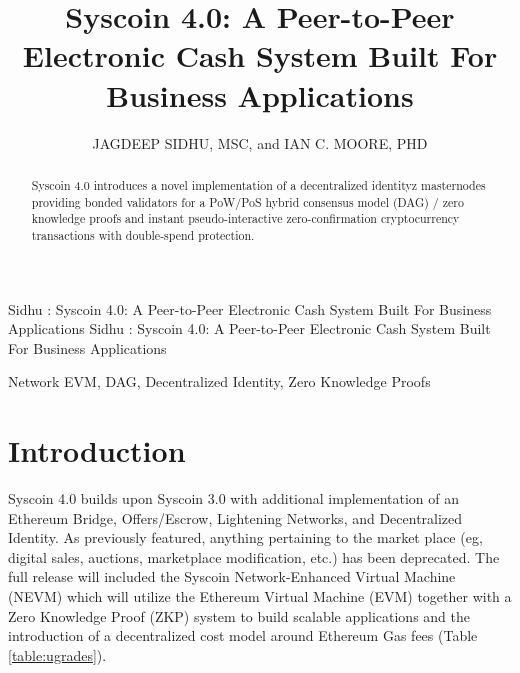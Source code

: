 \documentclass[peerreview]{ieeesyscoin}
\begin{document}
\linenumbers
\history{}

\title{\centering Syscoin 4.0: A Peer-to-Peer Electronic Cash System Built For Business Applications}
\author{\centering  \uppercase{Jagdeep Sidhu, MSc}, 
and \uppercase{Ian C. Moore, PhD}}

\address[1]{\centering Syscoin Core Developer, Blockchain Foundry Inc.(e-mail: jsidhu@blockchainfoundry.co)}
\address[2]{\centering  (e-mail: ic3moore@gmail.com)}
\tfootnote{}

\markboth
{Sidhu \headeretal: Syscoin 4.0: A Peer-to-Peer Electronic Cash System Built For Business Applications}
{Sidhu \headeretal: Syscoin 4.0: A Peer-to-Peer Electronic Cash System Built For Business Applications}

\corresp{}

\begin{abstract}
Syscoin 4.0 introduces a novel implementation of a decentralized identityz masternodes providing bonded validators for a PoW/PoS hybrid consensus model (DAG) / zero knowledge proofs and instant pseudo-interactive zero-confirmation cryptocurrency transactions with double-spend protection.
\end{abstract}

\begin{keywords}
Network EVM, DAG, Decentralized Identity, Zero Knowledge Proofs
\end{keywords}

\titlepgskip=-15pt

\maketitle

\section{Introduction}
\label{sec:introduction}

Syscoin 4.0 builds upon Syscoin 3.0 with additional implementation of an Ethereum Bridge, Offers/Escrow, Lightening Networks, and Decentralized Identity. As previously featured, anything pertaining to the market place (eg, digital sales, auctions, marketplace modification, etc.) has been deprecated. The full release will included the Syscoin Network-Enhanced Virtual Machine (NEVM) which will utilize the Ethereum Virtual Machine (EVM) together with a Zero Knowledge Proof (ZKP) system to build scalable applications and the introduction of a decentralized cost model around Ethereum Gas fees (Table \ref{table:ugrades}).
\end{document}

